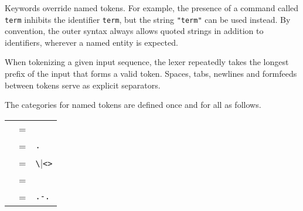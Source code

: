 \begin{isabellebody}
\begin{isamarkuptext}
  Keywords override named tokens.  For example, the presence of a
  command called \verb|term| inhibits the identifier \verb|term|, but the string \verb|"term"| can be used instead.
  By convention, the outer syntax always allows quoted strings in
  addition to identifiers, wherever a named entity is expected.

  When tokenizing a given input sequence, the lexer repeatedly takes
  the longest prefix of the input that forms a valid token.  Spaces,
  tabs, newlines and formfeeds between tokens serve as explicit
  separators.

  \medskip The categories for named tokens are defined once and for
  all as follows.

  \begin{center}
  \begin{supertabular}{rcl}
    \hypertarget{syntax.ident}{\hyperlink{syntax.ident}{\mbox{}}} & = &  \\
    \hypertarget{syntax.longident}{\hyperlink{syntax.longident}{\mbox{}}} & = & \verb|.| \\
    \hypertarget{syntax.symident}{\hyperlink{syntax.symident}{\mbox{}}} & = & \verb|\|\verb|<|\verb|>| \\
    \hypertarget{syntax.nat}{\hyperlink{syntax.nat}{\mbox{}}} & = &  \\
    \hypertarget{syntax.float}{\hyperlink{syntax.float}{\mbox{}}} & = & \hyperlink{syntax.nat}{\mbox{}}\verb|.|\hyperlink{syntax.nat}{\mbox{}}\verb|-|\hyperlink{syntax.nat}{\mbox{}}\verb|.|\hyperlink{syntax.nat}{\mbox{}} \\

\end{supertabular}
\end{center}
\end{isamarkuptext}
\end{isabellebody}
